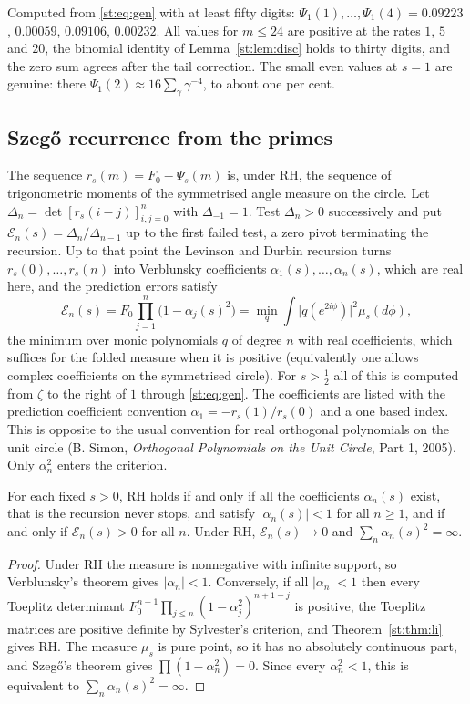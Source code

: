 Computed from \eqref{st:eq:gen} with at least fifty digits: $\Psi_1(1),\dots,\Psi_1(4)=0.09223$, $0.00059$, $0.09106$, $0.00232$. All values for $m\le24$ are positive at the rates $1$, $5$ and $20$, the binomial identity of Lemma~\ref{st:lem:disc} holds to thirty digits, and the zero sum agrees after the tail correction. The small even values at $s=1$ are genuine: there $\Psi_1(2)\approx16\sum_\gamma\gamma^{-4}$, to about one per cent.

\subsection{Szeg\H{o} recurrence from the primes}
The sequence $r_s(m)=F_0-\Psi_s(m)$ is, under RH, the sequence of trigonometric moments of the symmetrised angle measure on the circle. Let $\Delta_n=\det[r_s(i-j)]_{i,j=0}^{n}$ with $\Delta_{-1}=1$. Test $\Delta_n>0$ successively and put $\mathcal E_n(s)=\Delta_n/\Delta_{n-1}$ up to the first failed test, a zero pivot terminating the recursion. Up to that point the Levinson and Durbin recursion turns $r_s(0),\dots,r_s(n)$ into Verblunsky coefficients $\alpha_1(s),\dots,\alpha_n(s)$, which are real here, and the prediction errors satisfy
\[
\mathcal E_n(s)=F_0\prod_{j=1}^n\big(1-\alpha_j(s)^2\big)=\min_{q}\int\big|q(e^{2i\phi})\big|^2\mu_s(d\phi),
\]
the minimum over monic polynomials $q$ of degree $n$ with real coefficients, which suffices for the folded measure when it is positive (equivalently one allows complex coefficients on the symmetrised circle). For $s>\tfrac12$ all of this is computed from $\zeta$ to the right of $1$ through \eqref{st:eq:gen}. The coefficients are listed with the prediction coefficient convention $\alpha_1=-r_s(1)/r_s(0)$ and a one based index. This is opposite to the usual convention for real orthogonal polynomials on the unit circle (B. Simon, \emph{Orthogonal Polynomials on the Unit Circle}, Part 1, 2005). Only $\alpha_n^2$ enters the criterion.
\begin{theorem}\label{st:thm:verb}
For each fixed $s>0$, RH holds if and only if all the coefficients $\alpha_n(s)$ exist, that is the recursion never stops, and satisfy $|\alpha_n(s)|<1$ for all $n\ge1$, and if and only if $\mathcal E_n(s)>0$ for all $n$. Under RH, $\mathcal E_n(s)\to0$ and $\sum_n\alpha_n(s)^2=\infty$.
\end{theorem}
\begin{proof}
Under RH the measure is nonnegative with infinite support, so Verblunsky's theorem gives $|\alpha_n|<1$. Conversely, if all $|\alpha_n|<1$ then every Toeplitz determinant $F_0^{n+1}\prod_{j\le n}(1-\alpha_j^2)^{n+1-j}$ is positive, the Toeplitz matrices are positive definite by Sylvester's criterion, and Theorem~\ref{st:thm:li} gives RH. The measure $\mu_s$ is pure point, so it has no absolutely continuous part, and Szeg\H{o}'s theorem gives $\prod(1-\alpha_n^2)=0$. Since every $\alpha_n^2<1$, this is equivalent to $\sum_n\alpha_n(s)^2=\infty$.
\end{proof}

